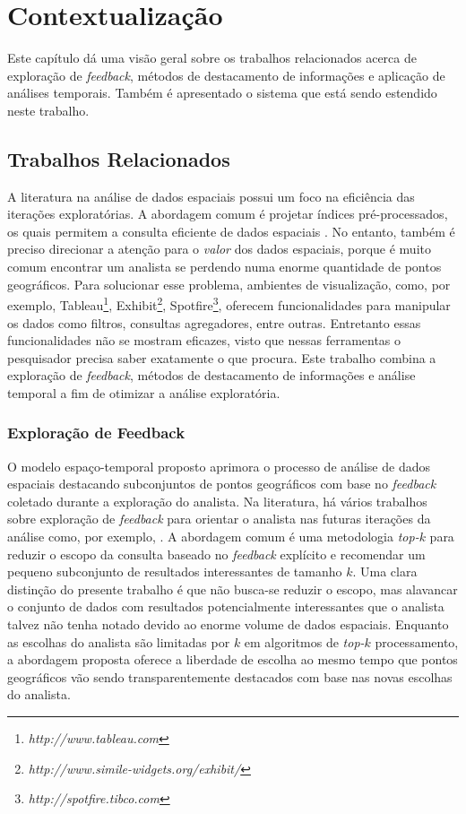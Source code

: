 \chapter{Contextualização}
\label{chap:contextualizacao}

Este capítulo dá uma visão geral sobre os trabalhos relacionados acerca de exploração de {\em feedback}, métodos de destacamento de informações e aplicação de análises temporais. Também é apresentado o sistema que está sendo estendido neste trabalho.

\section{Trabalhos Relacionados}

A literatura na análise de dados espaciais possui um foco na eficiência das iterações exploratórias. A abordagem comum é projetar índices pré-processados, os quais permitem a consulta eficiente de dados espaciais \cite{lins2013nanocubes}. No entanto, também é preciso direcionar a atenção para o {\em valor} dos dados espaciais, porque é muito comum encontrar um analista se perdendo numa enorme quantidade de pontos geográficos. Para solucionar esse problema, ambientes de visualização, como, por exemplo, Tableau\footnote{\em http://www.tableau.com}, Exhibit\footnote{\em http://www.simile-widgets.org/exhibit/}, Spotfire\footnote{\em  http://spotfire.tibco.com}, oferecem funcionalidades para manipular os dados como filtros, consultas agregadores, entre outras. Entretanto essas funcionalidades não se mostram eficazes, visto que nessas ferramentas o pesquisador precisa saber exatamente o que procura. Este trabalho combina a exploração de {\em feedback}, métodos de destacamento de informações e análise temporal a fim de otimizar a análise exploratória.

\subsection{Exploração de Feedback}

O modelo espaço-temporal proposto aprimora o processo de análise de dados espaciais destacando subconjuntos de pontos geográficos com base no {\em feedback} coletado durante a exploração do analista. Na literatura, há vários trabalhos sobre exploração de {\em feedback} para orientar o analista nas futuras iterações da análise como, por exemplo, . A abordagem comum é uma metodologia {\em top-$k$} para reduzir o escopo da consulta baseado no {\em feedback} explícito e recomendar um pequeno subconjunto de resultados interessantes de tamanho $k$. Uma clara distinção do presente trabalho é que não busca-se reduzir o escopo, mas alavancar o conjunto de dados com resultados potencialmente interessantes que o analista talvez não tenha notado devido ao enorme volume de dados espaciais. Enquanto as escolhas do analista são limitadas por $k$ em algoritmos de {\em top-$k$} processamento, a abordagem proposta oferece a liberdade de escolha ao mesmo tempo que pontos geográficos vão sendo transparentemente destacados com base nas novas escolhas do analista.


